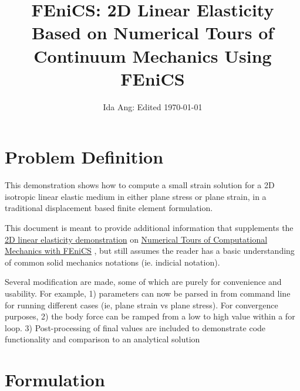\documentclass[12pt,3p]{article}
\begin{document}
\title{\Large{FEniCS: 2D Linear Elasticity} \\
	\large{Based on Numerical Tours of Continuum Mechanics Using FEniCS} \vspace{-2ex}}

\author{Ida Ang: Edited \today}
\date{\vspace{-5ex}}
\maketitle

\tableofcontents
\newpage

\section{Problem Definition}
\vspace{-2ex}
This demonstration shows how to compute a small strain solution for a 2D isotropic linear elastic medium in either plane stress or plane strain, in a traditional displacement based finite element formulation. 

This document is meant to provide additional information that supplements the  \href{https://comet-fenics.readthedocs.io/en/latest/demo/elasticity/2D_elasticity.py.html}{2D linear elasticity demonstration} on \href{https://comet-fenics.readthedocs.io}{Numerical Tours of Computational Mechanics with FEniCS} , but still assumes the reader has a basic understanding of common solid mechanics notations (ie. indicial notation). 

Several modification are made, some of which are purely for convenience and usability. For example, 1) parameters can now be parsed in from command line for running different cases (ie, plane strain vs plane stress). For convergence purposes, 2) the body force can be ramped from a low to high value within a for loop. 3) Post-processing of final values are included to demonstrate code functionality and comparison to an analytical solution

\section{Formulation}
\vspace{-2ex}
\end{document}
